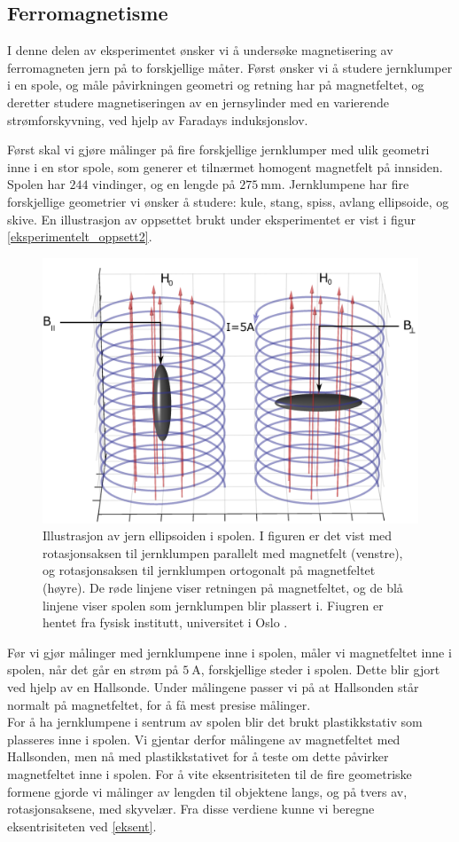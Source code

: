 \documentclass[%
 reprint,
 amsmath,amssymb,
 aps,
 norsk,
]{revtex4-1}
\begin{document}
\subsection{Ferromagnetisme}
I denne delen av eksperimentet ønsker vi å undersøke magnetisering av ferromagneten jern på to forskjellige måter. Først ønsker vi å studere jernklumper i en spole, og måle påvirkningen geometri og retning har på magnetfeltet, og deretter studere magnetiseringen av en jernsylinder med en varierende strømforskyvning, ved hjelp av Faradays induksjonslov. \par
Først skal vi gjøre målinger på fire forskjellige jernklumper med ulik geometri inne i en stor spole, som generer et tilnærmet homogent magnetfelt på innsiden. Spolen har $244$ vindinger, og en lengde på $\SI{275}{\milli\meter}$. Jernklumpene har fire forskjellige geometrier vi ønsker å studere: kule, stang, spiss, avlang ellipsoide, og skive. En illustrasjon av oppsettet brukt under eksperimentet er vist i figur \vref{eksperimentelt_oppsett2}.
\begin{figure}[h!]
  \centering
  \includegraphics[scale=0.24]{oppsett2.png}
  \caption{Illustrasjon av jern ellipsoiden i spolen. I figuren er det vist med rotasjonsaksen til jernklumpen parallelt med magnetfelt (venstre), og rotasjonsaksen til jernklumpen ortogonalt på magnetfeltet (høyre). De røde linjene viser retningen på magnetfeltet, og de blå linjene viser spolen som jernklumpen blir plassert i. Fiugren er hentet fra fysisk institutt, universitet i Oslo \cite{oppgave}.}
  \label{eksperimentelt_oppsett2}
\end{figure}
Før vi gjør målinger med jernklumpene inne i spolen, måler vi magnetfeltet inne i spolen, når det går en strøm på $\SI{5}{\ampere}$, forskjellige steder i spolen. Dette blir gjort ved hjelp av en Hallsonde. Under målingene passer vi på at Hallsonden står normalt på magnetfeltet, for å få mest presise målinger.\\For å ha jernklumpene i sentrum av spolen blir det brukt plastikkstativ som plasseres inne i spolen. Vi gjentar derfor målingene av magnetfeltet med Hallsonden, men nå med plastikkstativet for å teste om dette påvirker magnetfeltet inne i spolen. For å vite eksentrisiteten til de fire geometriske formene gjorde vi målinger av lengden til objektene langs, og på tvers av, rotasjonsaksene, med skyvelær. Fra disse verdiene kunne vi beregne eksentrisiteten ved \eqref{eksent}.\\
\end{document}
